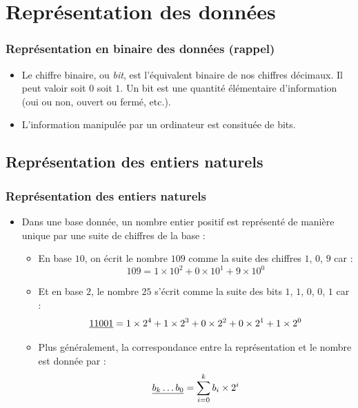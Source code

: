\documentclass[xcolor=svgnames]{beamer}
\begin{document}
\section[Représentation des données]{Représentation  des données}

\begin{frame}
  \frametitle{Représentation en binaire des données (rappel)\nowrite}
  \pause

  \begin{definition}[bit]
    \begin{itemize}
    \item Le chiffre binaire, ou \emph{bit}, est l'équivalent binaire
      de nos chiffres décimaux. Il peut valoir soit $0$ soit $1$. Un
      bit est une quantité élémentaire d'information (oui ou non,
      ouvert ou fermé, etc.).\pause
    \item L'information manipulée par un ordinateur est consituée de
      bits.
    \end{itemize}
  \end{definition}
\end{frame}

\subsection{Représentation des entiers naturels}
\begin{frame}
 \frametitle{Représentation des entiers naturels}
  \begin{itemize}
  \item Dans une base donnée, un nombre entier positif est représenté
    de manière unique par une suite de chiffres de la base :\pause
    \begin{itemize}
    \item En base $10$, on écrit le nombre $109$ comme la suite des
      chiffres $1$, $0$, $9$ car :
\[
109 = 1\times 10^2 + 0\times 10^1 + 9 \times 10^0
\]
\pause
\item Et en base $2$, le nombre $25$ s'écrit comme la suite des bits
  $1$, $1$, $0$, $0$, $1$ car :
\[
\underline{11001} = 1\times
      2^4 + 1\times 2^3 + 0\times 2^2 + 0\times 2^1 + 1\times 2^0
\]
\pause
\item Plus généralement, la correspondance entre la représentation et le nombre est donnée par :
\[
\underline{b_k\ldots b_0} = \sum^{k}_{i = 0} b_i \times 2^i
\]
\end{itemize}
\end{itemize}
\end{frame}
\end{document}

